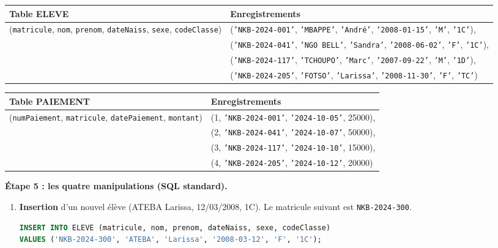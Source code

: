 \documentclass[11pt]{article}
\begin{document}
\begin{exoresolu}
\begin{center}
\begin{tabularx}{\linewidth}{|l|X|}
\hline
\rowcolor{popgreenL} \textbf{Table ELEVE} & \textbf{Enregistrements} \\
\hline
(\texttt{matricule}, \texttt{nom}, \texttt{prenom}, \texttt{dateNaiss}, \texttt{sexe}, \texttt{codeClasse}) &
(\texttt{'NKB-2024-001'}, \texttt{'MBAPPE'}, \texttt{'André'}, \texttt{'2008-01-15'}, \texttt{'M'}, \texttt{'1C'}), \\
& (\texttt{'NKB-2024-041'}, \texttt{'NGO BELL'}, \texttt{'Sandra'}, \texttt{'2008-06-02'}, \texttt{'F'}, \texttt{'1C'}), \\
& (\texttt{'NKB-2024-117'}, \texttt{'TCHOUPO'}, \texttt{'Marc'}, \texttt{'2007-09-22'}, \texttt{'M'}, \texttt{'1D'}), \\
& (\texttt{'NKB-2024-205'}, \texttt{'FOTSO'}, \texttt{'Larissa'}, \texttt{'2008-11-30'}, \texttt{'F'}, \texttt{'TC'}) \\
\hline
\end{tabularx}
\end{center}

\begin{center}
\begin{tabularx}{\linewidth}{|l|X|}
\hline
\rowcolor{poporangeL} \textbf{Table PAIEMENT} & \textbf{Enregistrements} \\
\hline
(\texttt{numPaiement}, \texttt{matricule}, \texttt{datePaiement}, \texttt{montant}) &
(1, \texttt{'NKB-2024-001'}, \texttt{'2024-10-05'}, 25000), \\
& (2, \texttt{'NKB-2024-041'}, \texttt{'2024-10-07'}, 50000), \\
& (3, \texttt{'NKB-2024-117'}, \texttt{'2024-10-10'}, 15000), \\
& (4, \texttt{'NKB-2024-205'}, \texttt{'2024-10-12'}, 20000) \\
\hline
\end{tabularx}
\end{center}

\textbf{Étape 5 : les quatre manipulations (SQL standard).}

\begin{enumerate}
\item \textbf{Insertion} d'un nouvel élève (ATEBA Larissa, 12/03/2008, 1C). Le matricule suivant est \texttt{NKB-2024-300}.
\begin{lstlisting}[language=SQL]
INSERT INTO ELEVE (matricule, nom, prenom, dateNaiss, sexe, codeClasse)
VALUES ('NKB-2024-300', 'ATEBA', 'Larissa', '2008-03-12', 'F', '1C');
\end{lstlisting}


\end{enumerate}
\end{exoresolu}
\end{document}
